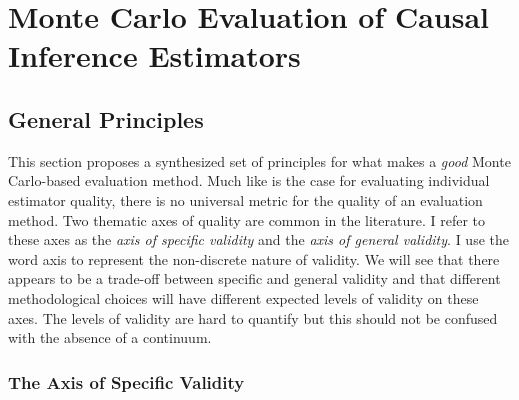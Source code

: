 \documentclass[../main.tex]{subfiles}
\begin{document}
\section{Monte Carlo Evaluation of Causal Inference Estimators}
\subsection{General Principles}

\vspace{\baselineskip}
This section proposes a synthesized set of principles for what makes a \textit{good }Monte Carlo-based evaluation method. Much like is the case for evaluating individual estimator quality, there is no universal metric for the quality of an evaluation method. Two thematic axes of quality are common in the literature. I refer to these axes as the \textit{axis of specific validity }and the\textit{ axis of general validity}. I use the word axis to represent the non-discrete nature of validity. We will see that there appears to be a trade-off between specific and general validity and that different methodological choices will have different expected levels of validity on these axes. The levels of validity are hard to quantify but this should not be confused with the absence of a continuum.\par

\subsubsection{The Axis of Specific Validity}
\end{document}

